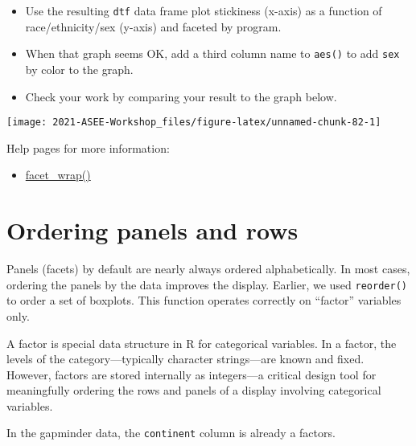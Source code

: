 \documentclass[
]{book}
\providecommand{\tightlist}{%
  \setlength{\itemsep}{0pt}\setlength{\parskip}{0pt}}
\begin{document}
\begin{itemize}
\tightlist
\item
  Use the resulting \texttt{dtf} data frame plot stickiness (x-axis) as a function of race/ethnicity/sex (y-axis) and faceted by program.\\
\item
  When that graph seems OK, add a third column name to \texttt{aes()} to add \texttt{sex} by color to the graph.
\item
  Check your work by comparing your result to the graph below.
\end{itemize}

\texttt{[image: 2021-ASEE-Workshop\_files/figure-latex/unnamed-chunk-82-1]}

Help pages for more information:

\begin{itemize}
\tightlist
\item
  \href{https://ggplot2.tidyverse.org/reference/facet_wrap.html}{facet\_wrap()}
\end{itemize}

\hypertarget{ordering-panels-and-rows}{%
\section{Ordering panels and rows}\label{ordering-panels-and-rows}}

Panels (facets) by default are nearly always ordered alphabetically. In most cases, ordering the panels by the data improves the display. Earlier, we used \texttt{reorder()} to order a set of boxplots. This function operates correctly on ``factor'' variables only.

A factor is special data structure in R for categorical variables. In a factor, the levels of the category---typically character strings---are known and fixed. However, factors are stored internally as integers---a critical design tool for meaningfully ordering the rows and panels of a display involving categorical variables.

In the gapminder data, the \texttt{continent} column is already a factors.
\end{document}
